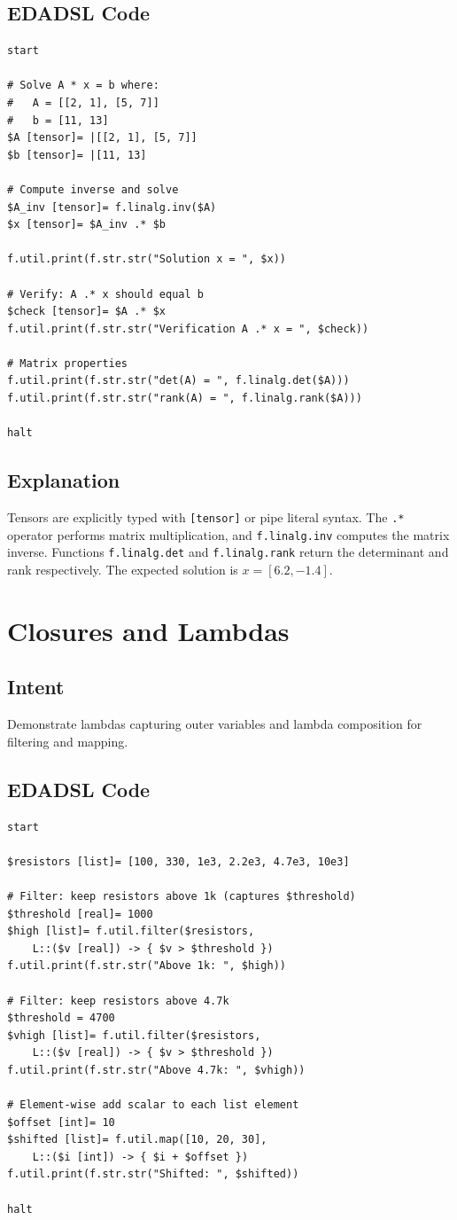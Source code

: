 \subsection{EDADSL Code}
\begin{verbatim}
start

# Solve A * x = b where:
#   A = [[2, 1], [5, 7]]
#   b = [11, 13]
$A [tensor]= |[[2, 1], [5, 7]]
$b [tensor]= |[11, 13]

# Compute inverse and solve
$A_inv [tensor]= f.linalg.inv($A)
$x [tensor]= $A_inv .* $b

f.util.print(f.str.str("Solution x = ", $x))

# Verify: A .* x should equal b
$check [tensor]= $A .* $x
f.util.print(f.str.str("Verification A .* x = ", $check))

# Matrix properties
f.util.print(f.str.str("det(A) = ", f.linalg.det($A)))
f.util.print(f.str.str("rank(A) = ", f.linalg.rank($A)))

halt
\end{verbatim}

\subsection{Explanation}
Tensors are explicitly typed with \texttt{[tensor]} or pipe literal syntax. The \texttt{.*} operator performs matrix multiplication, and \texttt{f.linalg.inv} computes the matrix inverse. Functions \texttt{f.linalg.det} and \texttt{f.linalg.rank} return the determinant and rank respectively. The expected solution is $x = [6.2, -1.4]$.

\section{Closures and Lambdas}
\subsection{Intent}
Demonstrate lambdas capturing outer variables and lambda composition for filtering and mapping.

\subsection{EDADSL Code}
\begin{verbatim}
start

$resistors [list]= [100, 330, 1e3, 2.2e3, 4.7e3, 10e3]

# Filter: keep resistors above 1k (captures $threshold)
$threshold [real]= 1000
$high [list]= f.util.filter($resistors,
    L::($v [real]) -> { $v > $threshold })
f.util.print(f.str.str("Above 1k: ", $high))

# Filter: keep resistors above 4.7k
$threshold = 4700
$vhigh [list]= f.util.filter($resistors,
    L::($v [real]) -> { $v > $threshold })
f.util.print(f.str.str("Above 4.7k: ", $vhigh))

# Element-wise add scalar to each list element
$offset [int]= 10
$shifted [list]= f.util.map([10, 20, 30],
    L::($i [int]) -> { $i + $offset })
f.util.print(f.str.str("Shifted: ", $shifted))

halt
\end{verbatim}

